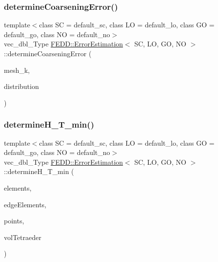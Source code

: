 \mbox{\label{classFEDD_1_1ErrorEstimation_a870423d1ecf6258bef063aadde49ac28}} 
\subsubsection{\texorpdfstring{determine\+Coarsening\+Error()}{determineCoarseningError()}}
{\footnotesize\ttfamily template$<$class SC  = default\+\_\+sc, class LO  = default\+\_\+lo, class GO  = default\+\_\+go, class NO  = default\+\_\+no$>$ \\
vec\+\_\+dbl\+\_\+\+Type \hyperlink{classFEDD_1_1ErrorEstimation}{F\+E\+D\+D\+::\+Error\+Estimation}$<$ SC, LO, GO, NO $>$\+::determine\+Coarsening\+Error (\begin{DoxyParamCaption}\item[{\hyperlink{classFEDD_1_1ErrorEstimation_a541e398a65d9618f8f316a941b57f5cb}{Mesh\+Unstr\+Ref\+Ptr\+\_\+\+Type}}]{mesh\+\_\+k,  }\item[{string}]{distribution }\end{DoxyParamCaption})}

\mbox{\label{classFEDD_1_1ErrorEstimation_a45bbf7b54fcdf403d3a9b273ac08fb9f}} 
\subsubsection{\texorpdfstring{determine\+H\+\_\+\+T\+\_\+min()}{determineH\_T\_min()}}
{\footnotesize\ttfamily template$<$class SC  = default\+\_\+sc, class LO  = default\+\_\+lo, class GO  = default\+\_\+go, class NO  = default\+\_\+no$>$ \\
vec\+\_\+dbl\+\_\+\+Type \hyperlink{classFEDD_1_1ErrorEstimation}{F\+E\+D\+D\+::\+Error\+Estimation}$<$ SC, LO, GO, NO $>$\+::determine\+H\+\_\+\+T\+\_\+min (\begin{DoxyParamCaption}\item[{\hyperlink{classFEDD_1_1ErrorEstimation_a524b367a9af6f2c128a7a7ae27d74535}{Elements\+New\+Ptr\+\_\+\+Type}}]{elements,  }\item[{\hyperlink{classFEDD_1_1ErrorEstimation_ad3347e220a355c8edda97dd2805bf7ff}{Edge\+Elements\+New\+Ptr\+\_\+\+Type}}]{edge\+Elements,  }\item[{vec2\+D\+\_\+dbl\+\_\+ptr\+\_\+\+Type}]{points,  }\item[{vec\+\_\+dbl\+\_\+\+Type \&}]{vol\+Tetraeder }\end{DoxyParamCaption})}

